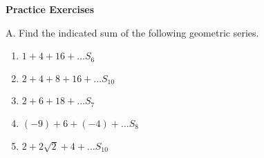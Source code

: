 \textbf{Practice Exercises}

\vspce

A. Find the indicated sum of the following geometric series.   

\begin{enumerate}[label = \arabic*. ]



	\item \hspce $1+4+16+\ldots S_6$
	\item \hspce $2+4+8+16+\ldots S_{10}$
	\item \hspce $2+6+18+\ldots S_7$
	\item \hspce $(-9)+6+(-4)+\ldots S_8$
	\item \hspce $2+2\sqrt{2}+4+\ldots S_{10}$
	
\end{enumerate}